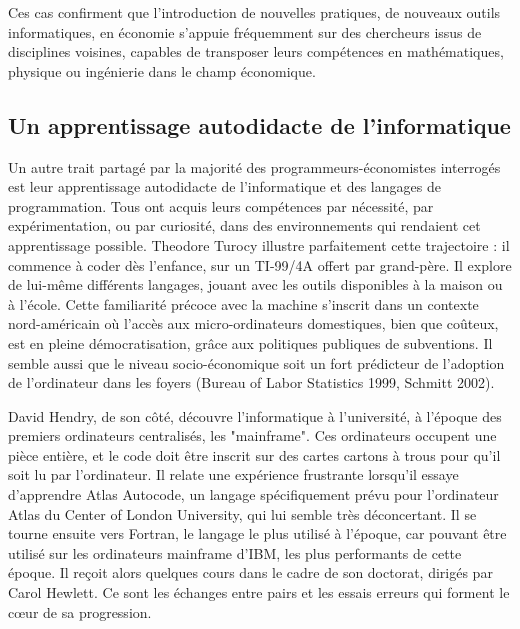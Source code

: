 Ces cas confirment que l’introduction de nouvelles pratiques, de nouveaux outils informatiques, en économie s’appuie fréquemment sur des chercheurs issus de disciplines voisines, capables de transposer leurs compétences en mathématiques, physique ou ingénierie dans le champ économique.





\subsection{Un apprentissage autodidacte de l'informatique}

Un autre trait partagé par la majorité des programmeurs-économistes interrogés est leur apprentissage autodidacte de l’informatique et des langages de programmation. Tous ont acquis leurs compétences par nécessité, par expérimentation, ou par curiosité, dans des environnements qui rendaient cet apprentissage possible. Theodore Turocy illustre parfaitement cette trajectoire : il commence à coder dès l’enfance, sur un TI-99/4A offert par grand-père. Il explore de lui-même différents langages, jouant avec les outils disponibles à la maison ou à l’école. Cette familiarité précoce avec la machine s’inscrit dans un contexte nord-américain où l’accès aux micro-ordinateurs domestiques, bien que coûteux, est en pleine démocratisation, grâce aux politiques publiques de subventions. Il semble aussi que le niveau socio-économique soit un fort prédicteur de l'adoption de l'ordinateur dans les foyers (Bureau of Labor Statistics 1999\cite{ComputerOwnershipSharply}, Schmitt 2002\cite{schmittGivePCsChange2002}). 

David Hendry, de son côté, découvre l’informatique à l’université, à l’époque des premiers ordinateurs centralisés, les "mainframe". Ces ordinateurs occupent une pièce entière, et le code doit être inscrit sur des cartes cartons à trous pour qu'il soit lu par l'ordinateur. Il relate une expérience frustrante lorsqu'il essaye d'apprendre Atlas Autocode, un langage spécifiquement prévu pour l'ordinateur Atlas du Center of London University, qui lui semble très déconcertant. Il se tourne ensuite vers Fortran, le langage le plus utilisé à l'époque, car pouvant être utilisé sur les ordinateurs mainframe d'IBM, les plus performants de cette époque. Il reçoit alors quelques cours dans le cadre de son doctorat, dirigés par Carol Hewlett. Ce sont les échanges entre pairs et les essais erreurs qui forment le cœur de sa progression. 

